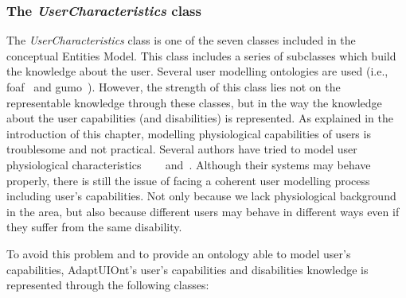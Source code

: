 \subsubsection{The \textit{UserCharacteristics} class}
\label{sec:user_characteristics_class}

The \textit{UserCharacteristics} class is one of the seven classes included in
the conceptual Entities Model. This class includes a series of subclasses which
build the knowledge about the user. Several user modelling ontologies are used
(i.e., \ac{foaf}~\citep{foaf} and \ac{gumo}~\citep{heckmann_gumogeneral_2005}). 
However, the strength of this class lies not on the representable knowledge 
through these classes, but in the way the knowledge about the user capabilities
(and disabilities) is represented. As explained in the introduction of this 
chapter, modelling physiological capabilities of users is troublesome and not 
practical. Several authors have tried to model user physiological characteristics~\citep{gregor_designing_2002}
\citep{razmerita_ontology_based_2003}~\citep{pereira_triple_2005}~\citep{persad_characterising_2007}
\citep{persad_cognitive_2007} and~\citep{skillen2012ontological}. Although their
systems may behave properly, there is still the issue of facing a coherent user
modelling process including user's capabilities. Not only because we lack
physiological background in the area, but also because different users may behave
in different ways even if they suffer from the same disability. 

To avoid this problem and to provide an ontology able to model user's 
capabilities, AdaptUIOnt's user's capabilities and disabilities knowledge is 
represented through the following classes:

